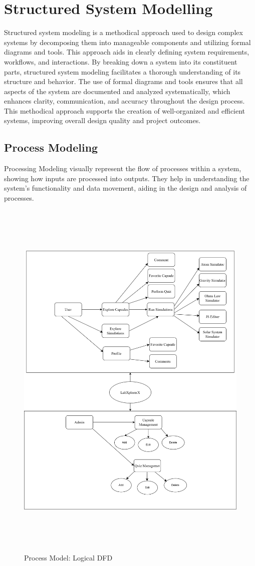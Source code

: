 \section{Structured System Modelling }
Structured system modeling is a methodical approach used to design complex systems by decomposing them into manageable components and utilizing formal diagrams and tools. This approach aids in clearly defining system requirements, workflows, and interactions. By breaking down a system into its constituent parts, structured system modeling facilitates a thorough understanding of its structure and behavior. The use of formal diagrams and tools ensures that all aspects of the system are documented and analyzed systematically, which enhances clarity, communication, and accuracy throughout the design process. This methodical approach supports the creation of well-organized and efficient systems, improving overall design quality and project outcomes.
\newpage
\subsection{Process Modeling}
Processing Modeling visually represent the flow of processes within a system, showing how inputs are processed into outputs. They help in understanding the system's functionality and data movement, aiding in the design and analysis of processes.
\begin{figure}[H]
    \centering
        \includegraphics[height = 18cm]{Diagrams/ProcessModelling.png}
    \caption{Process Model: Logical DFD}
\end{figure}
\newpage
\newpage
